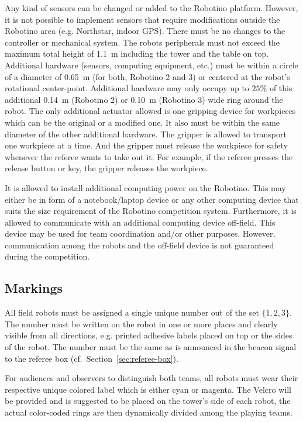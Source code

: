 \documentclass[12pt,twoside]{article}
\newcommand{\Robotino}{Robotino}
\newcommand{\refsec}[1]{Section~\ref{#1}}
\begin{document}
Any kind of sensors can be changed or added to	 the Robotino platform.
However, it is not possible to implement sensors that require 
modifications outside the Robotino area (e.g. Northstar, indoor GPS).
There must be no changes to the controller or mechanical system.
The robots peripherals must not exceed the maximum total height of 
\SI{1.1}{\metre} including the tower and the table on top. Additional
hardware (sensors, computing equipment, etc.)  must be within a circle 
of a diameter of \SI{0.65}{\metre}  (for both, Robotino 2 and 3) or 
centered at the robot's rotational center-point. Additional hardware 
may only occupy up to $25\%$ of this additional \SI{0.14}{\metre} 
(Robotino 2) or \SI{0.10}{\metre} (Robotino 3) wide ring around the 
robot. The only additional actuator allowed is one gripping device for 
workpieces which can be the original or a modified one. It also must 
be within the same diameter of the other additional hardware. The 
gripper is allowed to transport one workpiece at a time. And the 
gripper must release the workpiece for safety whenever the referee 
wants to take out it. For example, if the referee presses the release 
button or key, the gripper releases the workpiece.

It is allowed to install additional computing power on the
\Robotino. This may either be in form of a notebook/laptop device or
any other computing device that suits the size requirement of the
\Robotino{} competition system. Furthermore, it is allowed to
communicate with an additional computing device off-field. This device
may be used for team coordination and/or other purposes. However,
communication among the robots and the off-field device is not
guaranteed during the competition.

\subsection{Markings}
\label{sec:robot-markings}
All field robots must be assigned a single unique number out of the
set $\{1, 2, 3\}$. The number must be written on the robot in one or
more places and clearly visible from all directions, e.g. printed
adhesive labels placed on top or the sides of the robot. The number
must be the same as is announced in the beacon signal to the referee
box (cf.~\refsec{sec:referee-box}).

For audiences and observers to distinguish both teams, all robots must 
wear their respective unique colored label which is either cyan or magenta. 
The Velcro will be provided and is suggested to be placed on the tower's side 
of each robot, the actual color-coded rings are then dynamically divided among 
the playing teams.
\end{document}
